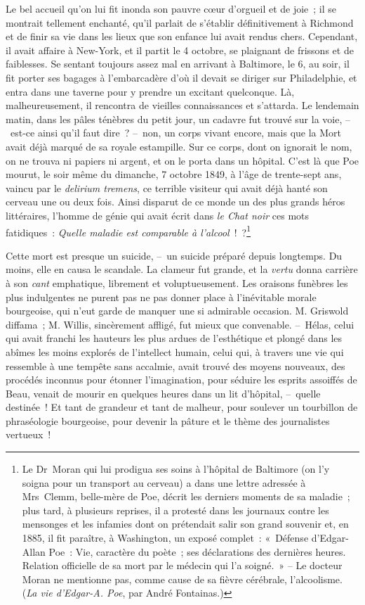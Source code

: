 \documentclass[french,twoside]{book} %
\begin{document}
Le bel accueil qu’on lui fit inonda son pauvre cœur d’orgueil et de joie ; il se montrait tellement enchanté, qu’il parlait de s’établir définitivement à Richmond et de finir sa vie dans les lieux que son enfance lui avait rendus chers. Cependant, il avait affaire à New-York, et il partit le 4 octobre, se plaignant de frissons et de faiblesses. Se sentant toujours assez mal en arrivant à Baltimore, le 6, au soir, il fit porter ses bagages à l’embarcadère d’où il devait se diriger sur Philadelphie, et entra dans une taverne pour y prendre un excitant quelconque. Là, malheureusement, il rencontra de vieilles connaissances et s’attarda. Le lendemain matin, dans les pâles ténèbres du petit jour, un cadavre fut trouvé sur la voie, – est-ce ainsi qu’il faut dire ? – non, un corps vivant encore, mais que la Mort avait déjà marqué de sa royale estampille. Sur ce corps, dont on ignorait le nom, on ne trouva ni papiers ni argent, et on le porta dans un hôpital. C’est là que Poe mourut, le soir même du dimanche, 7 octobre 1849, à l’âge de trente-sept ans, vaincu par le \emph{delirium tremens}, ce terrible visiteur qui avait déjà hanté son cerveau une ou deux fois. Ainsi disparut de ce monde un des plus grands héros littéraires, l’homme de génie qui avait écrit dans \emph{le Chat noir} ces mots fatidiques : \emph{Quelle maladie est comparable à l’alcool} ! ?\footnote{Le Dr Moran qui lui prodigua ses soins à l’hôpital de Baltimore (on l’y soigna pour un transport au cerveau) a dans une lettre adressée à Mrs Clemm, belle-mère de Poe, décrit les derniers moments de sa maladie ; plus tard, à plusieurs reprises, il a protesté dans les journaux contre les mensonges et les infamies dont on prétendait salir son grand souvenir et, en 1885, il fit paraître, à Washington, un exposé complet : « Défense d’Edgar-Allan Poe : Vie, caractère du poète ; ses déclarations des dernières heures. Relation officielle de sa mort par le médecin qui l’a soigné. » – Le docteur Moran ne mentionne pas, comme cause de sa fièvre cérébrale, l’alcoolisme. (\emph{La vie d’Edgar-A. Poe}, par André Fontainas.)}\par
Cette mort est presque un suicide, – un suicide préparé depuis longtemps. Du moins, elle en causa le scandale. La clameur fut grande, et la \emph{vertu} donna carrière à son \emph{cant} emphatique, librement et voluptueusement. Les oraisons funèbres les plus indulgentes ne purent pas ne pas donner place à l’inévitable morale bourgeoise, qui n’eut garde de manquer une si admirable occasion. M. Griswold diffama ; M. Willis, sincèrement affligé, fut mieux que convenable. – Hélas, celui qui avait franchi les hauteurs les plus ardues de l’esthétique et plongé dans les abîmes les moins explorés de l’intellect humain, celui qui, à travers une vie qui ressemble à une tempête sans accalmie, avait trouvé des moyens nouveaux, des procédés inconnus pour étonner l’imagination, pour séduire les esprits assoiffés de Beau, venait de mourir en quelques heures dans un lit d’hôpital, – quelle destinée ! Et tant de grandeur et tant de malheur, pour soulever un tourbillon de phraséologie bourgeoise, pour devenir la pâture et le thème des journalistes vertueux !\par
\end{document}
